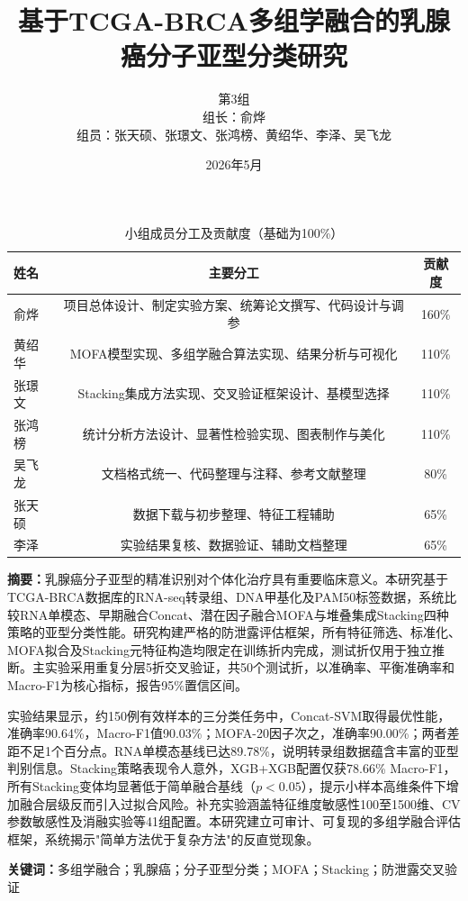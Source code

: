 \documentclass[UTF8,12pt,a4paper]{article}
\title{基于TCGA-BRCA多组学融合的乳腺癌分子亚型分类研究}
\author{第3组 \\
组长：俞烨 \\
组员：张天硕、张璟文、张鸿榜、黄绍华、李泽、吴飞龙}
\date{2026年5月}
\begin{document}
\maketitle

\begin{table}[H]
\centering
\caption{小组成员分工及贡献度（基础为100\%）}
\label{tab:team-contribution}
\begin{tabular}{lcc}
\toprule
\textbf{姓名} & \textbf{主要分工} & \textbf{贡献度} \\
\midrule
俞烨 & 项目总体设计、制定实验方案、统筹论文撰写、代码设计与调参 & 160\% \\
黄绍华 & MOFA模型实现、多组学融合算法实现、结果分析与可视化 & 110\% \\
张璟文 & Stacking集成方法实现、交叉验证框架设计、基模型选择 & 110\% \\
张鸿榜 & 统计分析方法设计、显著性检验实现、图表制作与美化 & 110\% \\
吴飞龙 & 文档格式统一、代码整理与注释、参考文献整理 & 80\% \\
张天硕 & 数据下载与初步整理、特征工程辅助 & 65\% \\
李泽 & 实验结果复核、数据验证、辅助文档整理 & 65\% \\
\bottomrule
\end{tabular}
\end{table}

\newpage

\textbf{摘要：}乳腺癌分子亚型的精准识别对个体化治疗具有重要临床意义。本研究基于TCGA-BRCA数据库的RNA-seq转录组、DNA甲基化及PAM50标签数据，系统比较RNA单模态、早期融合Concat、潜在因子融合MOFA与堆叠集成Stacking四种策略的亚型分类性能。研究构建严格的防泄露评估框架，所有特征筛选、标准化、MOFA拟合及Stacking元特征构造均限定在训练折内完成，测试折仅用于独立推断。主实验采用重复分层5折交叉验证，共50个测试折，以准确率、平衡准确率和Macro-F1为核心指标，报告95\%置信区间。

实验结果显示，约150例有效样本的三分类任务中，Concat-SVM取得最优性能，准确率90.64\%，Macro-F1值90.03\%；MOFA-20因子次之，准确率90.00\%；两者差距不足1个百分点。RNA单模态基线已达89.78\%，说明转录组数据蕴含丰富的亚型判别信息。Stacking策略表现令人意外，XGB+XGB配置仅获78.66\% Macro-F1，所有Stacking变体均显著低于简单融合基线（$p<0.05$），提示小样本高维条件下增加融合层级反而引入过拟合风险。补充实验涵盖特征维度敏感性100至1500维、CV参数敏感性及消融实验等41组配置。本研究建立可审计、可复现的多组学融合评估框架，系统揭示"简单方法优于复杂方法"的反直觉现象。

\vspace{0.5em}
\noindent\textbf{关键词：}多组学融合；乳腺癌；分子亚型分类；MOFA；Stacking；防泄露交叉验证
\end{document}
